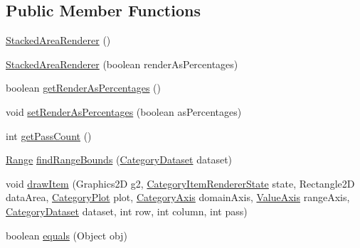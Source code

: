 \subsection*{Public Member Functions}
\begin{DoxyCompactItemize}
\item 
\mbox{\hyperlink{classorg_1_1jfree_1_1chart_1_1renderer_1_1category_1_1_stacked_area_renderer_a6b85a2294f6cadef351b8f9456613f47}{Stacked\+Area\+Renderer}} ()
\item 
\mbox{\hyperlink{classorg_1_1jfree_1_1chart_1_1renderer_1_1category_1_1_stacked_area_renderer_a6b4fc16c702f62516ba53d38b87c2be2}{Stacked\+Area\+Renderer}} (boolean render\+As\+Percentages)
\item 
boolean \mbox{\hyperlink{classorg_1_1jfree_1_1chart_1_1renderer_1_1category_1_1_stacked_area_renderer_ab6cd16e2ea257f3dd72716ae22583e44}{get\+Render\+As\+Percentages}} ()
\item 
void \mbox{\hyperlink{classorg_1_1jfree_1_1chart_1_1renderer_1_1category_1_1_stacked_area_renderer_aa477ef5dc9885abbf8021648090a1755}{set\+Render\+As\+Percentages}} (boolean as\+Percentages)
\item 
int \mbox{\hyperlink{classorg_1_1jfree_1_1chart_1_1renderer_1_1category_1_1_stacked_area_renderer_a973bdba1de70a34fcf8f3690d0f91897}{get\+Pass\+Count}} ()
\item 
\mbox{\hyperlink{classorg_1_1jfree_1_1data_1_1_range}{Range}} \mbox{\hyperlink{classorg_1_1jfree_1_1chart_1_1renderer_1_1category_1_1_stacked_area_renderer_abdb1c576d27ce382c8edcc957b7d26ba}{find\+Range\+Bounds}} (\mbox{\hyperlink{interfaceorg_1_1jfree_1_1data_1_1category_1_1_category_dataset}{Category\+Dataset}} dataset)
\item 
void \mbox{\hyperlink{classorg_1_1jfree_1_1chart_1_1renderer_1_1category_1_1_stacked_area_renderer_a33b71d3d6348d847b09b501164d502aa}{draw\+Item}} (Graphics2D g2, \mbox{\hyperlink{classorg_1_1jfree_1_1chart_1_1renderer_1_1category_1_1_category_item_renderer_state}{Category\+Item\+Renderer\+State}} state, Rectangle2D data\+Area, \mbox{\hyperlink{classorg_1_1jfree_1_1chart_1_1plot_1_1_category_plot}{Category\+Plot}} plot, \mbox{\hyperlink{classorg_1_1jfree_1_1chart_1_1axis_1_1_category_axis}{Category\+Axis}} domain\+Axis, \mbox{\hyperlink{classorg_1_1jfree_1_1chart_1_1axis_1_1_value_axis}{Value\+Axis}} range\+Axis, \mbox{\hyperlink{interfaceorg_1_1jfree_1_1data_1_1category_1_1_category_dataset}{Category\+Dataset}} dataset, int row, int column, int pass)
\item 
boolean \mbox{\hyperlink{classorg_1_1jfree_1_1chart_1_1renderer_1_1category_1_1_stacked_area_renderer_a2f61ae67a9d0aba5ae529c25f9c71b72}{equals}} (Object obj)
\end{DoxyCompactItemize}
